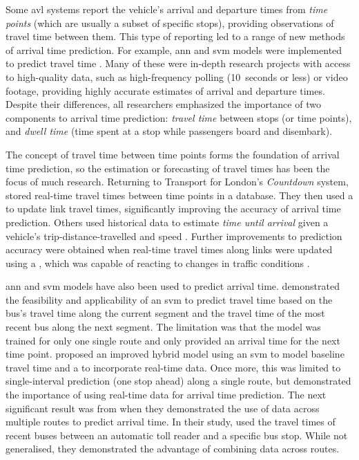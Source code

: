 Some \gls{avl} systems report the vehicle's arrival and departure times from \emph{time points} (which are usually a subset of specific stops), providing observations of travel time between them. This type of reporting led to a range of new methods of arrival time prediction. For example, \gls{ann} and \gls{svm} models were implemented to predict travel time \citep{Jeong_2005,Shalaby_2004,Yu_2011,Cats_2015,Cats_2016,Yin_2017}. Many of these were in-depth research projects with access to high-quality data, such as high-frequency polling (10~seconds or less) or video footage, providing highly accurate estimates of arrival and departure times. Despite their differences, all researchers emphasized the importance of two components to arrival time prediction: \emph{travel time} between stops (or time points), and \emph{dwell time} (time spent at a stop while passengers board and disembark).


The concept of travel time between time points forms the foundation of arrival time prediction, so the estimation or forecasting of travel times has been the focus of much research. Returning to Transport for London's \emph{Countdown} system, \citet{Reinhoudt_1997} stored real-time travel times between time points in a database. They then used a \kf{} to update link travel times, significantly improving the accuracy of arrival time prediction. Others used historical data to estimate \emph{time until arrival} given a vehicle's trip-distance-travelled and speed \citep{Wall_1999,Dailey_2001,Cathey_2003}. Further improvements to prediction accuracy were obtained when real-time travel times along links were updated using a \kf{}, which was capable of reacting to changes in traffic conditions \citep{Shalaby_2004}.


\Gls{ann} and \gls{svm} models have also been used to predict arrival time.  demonstrated the feasibility and applicability of an \gls{svm} to predict travel time based on the bus's travel time along the current segment and the travel time of the most recent bus along the next segment. The limitation was that the model was trained for only one single route and only provided an arrival time for the next time point. \citet{Yu_2010} proposed an improved hybrid model using an \gls{svm} to model baseline travel time and a \kf{} to incorporate real-time data. Once more, this was limited to single-interval prediction (one stop ahead) along a single route, but demonstrated the importance of using real-time data for arrival time prediction. The next significant result was from \citet{Yu_2011} when they demonstrated the use of data across multiple routes to predict arrival time. In their study, \citeauthor{Yu_2011} used the travel times of recent buses between an automatic toll reader and a specific bus stop. While not generalised, they demonstrated the advantage of combining data across routes.


